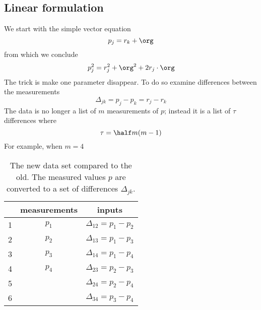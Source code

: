 \subsection{Linear formulation}  %
We start with the simple vector equation
  \begin{equation}
    p_{j} = r_{k} + \org 
  \end{equation}
from which we conclude
  \begin{equation}
    p_{j}^{2} = r_{j}^{2} + \org^{2} + 2 r_{j} \cdot \org 
  \end{equation}
The trick is make one parameter disappear. To do so examine differences between the measurements
  \begin{equation}
    \Delta_{jk} = p_{j} - p_{k} = r_{j} - r_{k} 
    \label{eqn:difference}
  \end{equation}
The data is no longer a list of $m$ measurements of $p$; instead it is a list of $\tau$ differences where 
  \begin{equation}
    \tau = \half m(m-1)
  \end{equation}
For example, when $m=4$
\begin{table}[htdp]
\caption{The new data set compared to the old. The measured values $p$ are converted to a set of differences $\Delta_{jk}$.}
\begin{center}
  \begin{tabular}{rcc}
    & measurements & inputs\\\hline
    1 & $p_{1}$ & $\Delta_{12} = p_{1} - p_{2}$ \\
    2 & $p_{2}$ & $\Delta_{13} = p_{1} - p_{3}$ \\
    3 & $p_{3}$ & $\Delta_{14} = p_{1} - p_{4}$ \\
    4 & $p_{4}$ & $\Delta_{23} = p_{2} - p_{3}$ \\
    5 &         & $\Delta_{24} = p_{2} - p_{4}$ \\
    6 &         & $\Delta_{34} = p_{3} - p_{4}$
  \end{tabular}
\end{center}
\label{tab:p's}
\end{table}%

